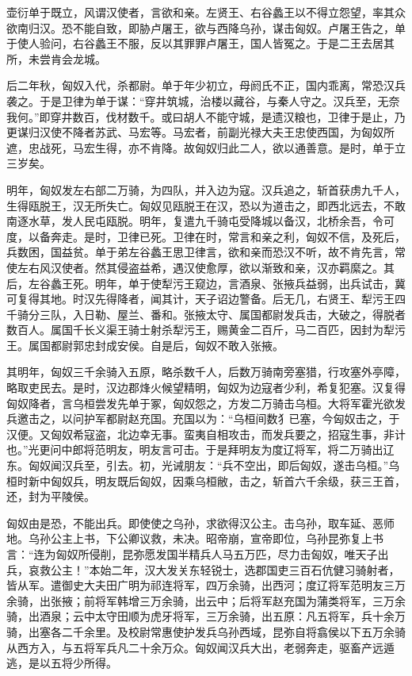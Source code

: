 \documentclass[12pt,UTF8]{ctexbook}
\begin{document}
壶衍单于既立，风谓汉使者，言欲和亲。左贤王、右谷蠡王以不得立怨望，率其众欲南归汉。恐不能自致，即胁卢屠王，欲与西降乌孙，谋击匈奴。卢屠王告之，单于使人验问，右谷蠡王不服，反以其罪罪卢屠王，国人皆冤之。于是二王去居其所，未尝肯会龙城。



后二年秋，匈奴入代，杀都尉。单于年少初立，母阏氏不正，国内乖离，常恐汉兵袭之。于是卫律为单于谋：“穿井筑城，治楼以藏谷，与秦人守之。汉兵至，无奈我何。”即穿井数百，伐材数千。或曰胡人不能守城，是遗汉粮也，卫律于是止，乃更谋归汉使不降者苏武、马宏等。马宏者，前副光禄大夫王忠使西国，为匈奴所遮，忠战死，马宏生得，亦不肯降。故匈奴归此二人，欲以通善意。是时，单于立三岁矣。



明年，匈奴发左右部二万骑，为四队，并入边为寇。汉兵追之，斩首获虏九千人，生得瓯脱王，汉无所失亡。匈奴见瓯脱王在汉，恐以为道击之，即西北远去，不敢南逐水草，发人民屯瓯脱。明年，复遣九千骑屯受降城以备汉，北桥余吾，令可度，以备奔走。是时，卫律已死。卫律在时，常言和亲之利，匈奴不信，及死后，兵数困，国益贫。单于弟左谷蠡王思卫律言，欲和亲而恐汉不听，故不肯先言，常使左右风汉使者。然其侵盗益希，遇汉使愈厚，欲以渐致和亲，汉亦羁縻之。其后，左谷蠡王死。明年，单于使犁污王窥边，言酒泉、张掖兵益弱，出兵试击，冀可复得其地。时汉先得降者，闻其计，天子诏边警备。后无几，右贤王、犁污王四千骑分三队，入日勒、屋兰、番和。张掖太守、属国都尉发兵击，大破之，得脱者数百人。属国千长义渠王骑士射杀犁污王，赐黄金二百斤，马二百匹，因封为犁污王。属国都尉郭忠封成安侯。自是后，匈奴不敢入张掖。



其明年，匈奴三千余骑入五原，略杀数千人，后数万骑南旁塞猎，行攻塞外亭障，略取吏民去。是时，汉边郡烽火候望精明，匈奴为边寇者少利，希复犯塞。汉复得匈奴降者，言乌桓尝发先单于冢，匈奴怨之，方发二万骑击乌桓。大将军霍光欲发兵邀击之，以问护军都尉赵充国。充国以为：“乌桓间数犭已塞，今匈奴击之，于汉便。又匈奴希寇盗，北边幸无事。蛮夷自相攻击，而发兵要之，招寇生事，非计也。”光更问中郎将范明友，明友言可击。于是拜明友为度辽将军，将二万骑出辽东。匈奴闻汉兵至，引去。初，光诫朋友：“兵不空出，即后匈奴，遂击乌桓。”乌桓时新中匈奴兵，明友既后匈奴，因乘乌桓敝，击之，斩首六千余级，获三王首，还，封为平陵侯。



匈奴由是恐，不能出兵。即使使之乌孙，求欲得汉公主。击乌孙，取车延、恶师地。乌孙公主上书，下公卿议救，未决。昭帝崩，宣帝即位，乌孙昆弥复上书言：“连为匈奴所侵削，昆弥愿发国半精兵人马五万匹，尽力击匈奴，唯天子出兵，哀救公主！”本始二年，汉大发关东轻锐士，选郡国吏三百石伉健习骑射者，皆从军。遣御史大夫田广明为祁连将军，四万余骑，出西河；度辽将军范明友三万余骑，出张掖；前将军韩增三万余骑，出云中；后将军赵充国为蒲类将军，三万余骑，出酒泉；云中太守田顺为虎牙将军，三万余骑，出五原：凡五将军，兵十余万骑，出塞各二千余里。及校尉常惠使护发兵乌孙西域，昆弥自将翕侯以下五万余骑从西方入，与五将军兵凡二十余万众。匈奴闻汉兵大出，老弱奔走，驱畜产远遁逃，是以五将少所得。
\end{document}
